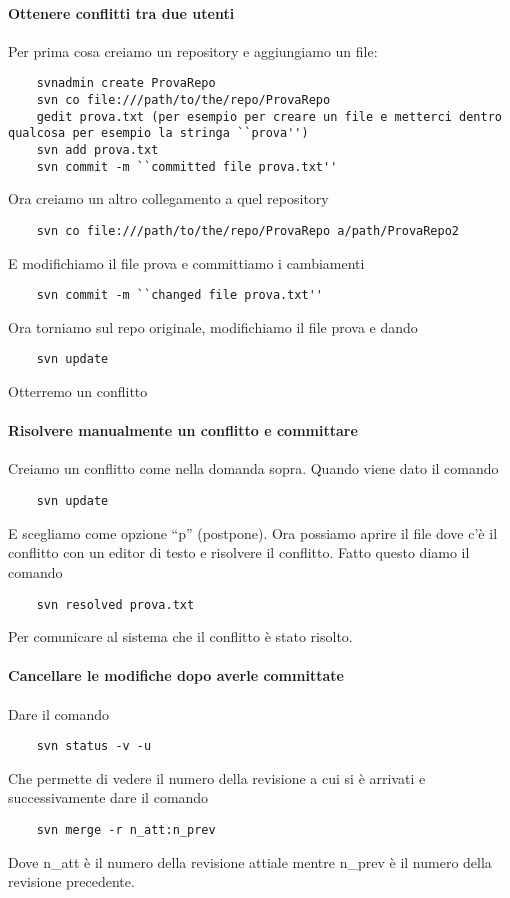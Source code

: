 \documentclass[a4paper]{article}
\begin{document}
	\paragraph{Ottenere conflitti tra due utenti}
	Per prima cosa creiamo un repository e aggiungiamo un file:
	\begin{verbatim}
	svnadmin create ProvaRepo
	svn co file:///path/to/the/repo/ProvaRepo
	gedit prova.txt (per esempio per creare un file e metterci dentro qualcosa per esempio la stringa ``prova'')
	svn add prova.txt
	svn commit -m ``committed file prova.txt''
	\end{verbatim}
	Ora creiamo un altro collegamento a quel repository
	\begin{verbatim}
	svn co file:///path/to/the/repo/ProvaRepo a/path/ProvaRepo2
	\end{verbatim}
	E modifichiamo il file prova e committiamo i cambiamenti
	\begin{verbatim}
	svn commit -m ``changed file prova.txt''
	\end{verbatim}
	Ora torniamo sul repo originale, modifichiamo il file prova e dando 
	\begin{verbatim}
	svn update
	\end{verbatim}
	Otterremo un conflitto

	\paragraph{Risolvere manualmente un conflitto e committare}
	Creiamo un conflitto come nella domanda sopra. Quando viene dato il comando 
	\begin{verbatim}
	svn update
	\end{verbatim}
	E scegliamo come opzione ``p'' (postpone). Ora possiamo aprire il file dove c'è il conflitto con un editor di testo e risolvere il conflitto. Fatto questo diamo il comando
	\begin{verbatim}
	svn resolved prova.txt
	\end{verbatim}
	Per comunicare al sistema che il conflitto è stato risolto.

	\paragraph{Cancellare le modifiche dopo averle committate}
	Dare il comando 
	\begin{verbatim}
	svn status -v -u
	\end{verbatim}
	Che permette di vedere il numero della revisione a cui si è arrivati e successivamente dare il comando
	\begin{verbatim}
	svn merge -r n_att:n_prev
	\end{verbatim}
	Dove n\_att è il numero della revisione attiale mentre n\_prev è il numero della revisione precedente.
	
\end{document}
